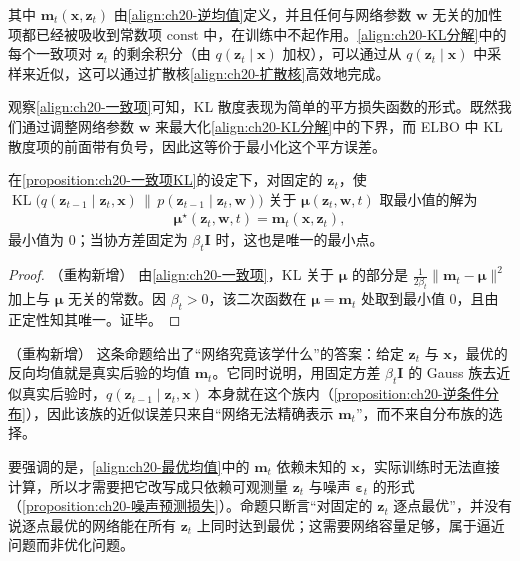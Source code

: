 \documentclass[../../main.tex]{subfiles}
\begin{document}
其中 $\bm{m}_t(\bm{x},\bm{z}_t)$ 由\eqref{align:ch20-逆均值}定义，并且任何与网络参数 $\bm{w}$ 无关的加性项都已经被吸收到常数项 $\mathrm{const}$ 中，在训练中不起作用。\eqref{align:ch20-KL分解}中的每个一致项对 $\bm{z}_t$ 的剩余积分（由 $q(\bm{z}_t\mid\bm{x})$ 加权），可以通过从 $q(\bm{z}_t\mid\bm{x})$ 中采样来近似，这可以通过扩散核\eqref{align:ch20-扩散核}高效地完成。

观察\eqref{align:ch20-一致项}可知，KL 散度表现为简单的平方损失函数的形式。既然我们通过调整网络参数 $\bm{w}$ 来最大化\eqref{align:ch20-KL分解}中的下界，而 ELBO 中 KL 散度项的前面带有负号，因此这等价于最小化这个平方误差。

\begin{proposition}[最优反向均值]\label{proposition:ch20-最优反向均值}
在\cref{proposition:ch20-一致项KL}的设定下，对固定的 $\bm{z}_t$，使 $\operatorname{KL}\big(q(\bm{z}_{t-1}\mid\bm{z}_t,\bm{x})\,\|\,p(\bm{z}_{t-1}\mid\bm{z}_t,\bm{w})\big)$ 关于 $\bm{\mu}(\bm{z}_t,\bm{w},t)$ 取最小值的解为
\begin{align}
\bm{\mu}^{\star}(\bm{z}_t,\bm{w},t)=\bm{m}_t(\bm{x},\bm{z}_t),
\label{align:ch20-最优均值}
\end{align}
最小值为 $0$；当协方差固定为 $\beta_t\bm{I}$ 时，这也是唯一的最小点。
\end{proposition}

\begin{proof}（重构新增）
由\eqref{align:ch20-一致项}，KL 关于 $\bm{\mu}$ 的部分是 $\frac{1}{2\beta_t}\|\bm{m}_t-\bm{\mu}\|^2$ 加上与 $\bm{\mu}$ 无关的常数。因 $\beta_t>0$，该二次函数在 $\bm{\mu}=\bm{m}_t$ 处取到最小值 $0$，且由正定性知其唯一。证毕。
\end{proof}

\begin{remark}（重构新增）
这条命题给出了“网络究竟该学什么”的答案：给定 $\bm{z}_t$ 与 $\bm{x}$，最优的反向均值就是真实后验的均值 $\bm{m}_t$。它同时说明，用固定方差 $\beta_t\bm{I}$ 的 Gauss 族去近似真实后验时，$q(\bm{z}_{t-1}\mid\bm{z}_t,\bm{x})$ 本身就在这个族内（\cref{proposition:ch20-逆条件分布}），因此该族的近似误差只来自“网络无法精确表示 $\bm{m}_t$”，而不来自分布族的选择。\par
要强调的是，\eqref{align:ch20-最优均值}中的 $\bm{m}_t$ 依赖未知的 $\bm{x}$，实际训练时无法直接计算，所以才需要把它改写成只依赖可观测量 $\bm{z}_t$ 与噪声 $\bm{\varepsilon}_t$ 的形式（\cref{proposition:ch20-噪声预测损失}）。命题只断言“对固定的 $\bm{z}_t$ 逐点最优”，并没有说逐点最优的网络能在所有 $\bm{z}_t$ 上同时达到最优；这需要网络容量足够，属于逼近问题而非优化问题。
\end{remark}
\end{document}
